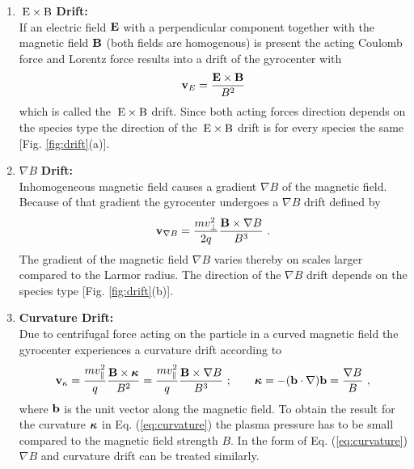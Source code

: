\begin{enumerate}
    \item {\boldmath $\mathrm{\:E}\times\mathrm{B}$} \textbf{Drift:}\\
    If an electric field $\boldsymbol{\mathbf{E}}$ with a perpendicular component together with the magnetic field $\boldsymbol{\mathbf{B}}$ (both fields are homogenous) is present the acting Coulomb force and Lorentz force results into a drift of the gyrocenter with
    \begin{gather}
        \boldsymbol{\mathbf{v}}_{E} = \frac{\boldsymbol{\mathbf{E}}\times\boldsymbol{\mathbf{B}}}{B^2}
        \label{eq:exb}
    \end{gather}
    which is called the $\mathrm{\:E}\times\mathrm{B}$ drift. Since both acting forces direction depends on the species type the direction of the $\mathrm{\:E}\times\mathrm{B}$ drift is for every species the same [Fig. \ref{fig:drift}(a)].
    \item {\boldmath $\nabla B$} \textbf{Drift:}\\
    Inhomogeneous magnetic field causes a gradient $\nabla B$ of the magnetic field. Because of that gradient the gyrocenter undergoes a $\nabla B$ drift defined by
    \begin{gather}
        \boldsymbol{\mathbf{v}}_{\nabla B} = \frac{m v^2_{\perp}}{2 q}\frac{\boldsymbol{\mathbf{B}}\times \nabla B}{B^3}~.
        \label{eq:gradB}
    \end{gather}
    The gradient of the magnetic field $\nabla B$ varies thereby on scales larger compared to the Larmor radius. The direction of the $\nabla B$ drift depends on the species type [Fig. \ref{fig:drift}(b)].
    \item \textbf{Curvature Drift:}\\
    Due to centrifugal force acting on the particle in a curved magnetic field the gyrocenter experiences a curvature drift according to
    \begin{gather}
        \boldsymbol{\mathbf{v}}_{\kappa} = \frac{m v^2_{\parallel}}{q}\frac{\boldsymbol{\mathbf{B}}\times \boldsymbol{\mathbf{\kappa}}}{B^2} = \frac{m v^2_{\parallel}}{q} \frac{\boldsymbol{\mathbf{B}}\times \nabla B}{B^3}~;\qquad\boldsymbol{\mathbf{\kappa}} = -(\boldsymbol{\mathbf{b}}\cdot \nabla)\boldsymbol{\mathbf{b}} = \frac{\nabla B}{B}~,
        \label{eq:curvature}
    \end{gather}
    where $\boldsymbol{\mathbf{b}}$ is the unit vector along the magnetic field. To obtain the result for the curvature $\boldsymbol{\mathbf{\kappa}}$ in Eq. (\ref{eq:curvature}) the plasma pressure has to be small compared to the magnetic field strength $B$. In the form of Eq. (\ref{eq:curvature}) $\nabla B$ and curvature drift can be treated similarly. \cite{Wesson2011}
\end{enumerate}

